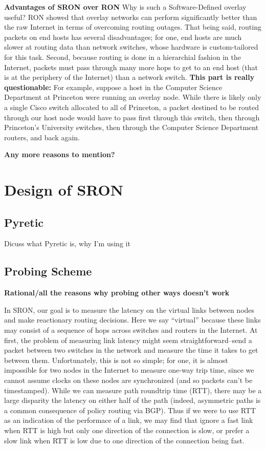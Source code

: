 \documentclass[pageno]{jpaper}
\begin{document}
{\bf Advantages of SRON over RON}
Why is such a Software-Defined overlay useful? RON\cite{ron} showed that overlay networks can 
perform significantly better than the raw Internet in terms of overcoming routing outages. That 
being said, routing packets on end hosts has several disadvantages; for one, end hosts are 
much slower at routing data than network switches, whose hardware is custom-tailored for this task.
Second, because routing is done in a hierarchial fashion in the Internet, packets must pass 
through many more hops to get to an end host (that is at the periphery of the Internet) than a 
network switch.
{\bf This part is really questionable:} 
For example, suppose a host in the Computer Science Department at Princeton 
were running an overlay node. While there is likely only a single Cisco switch allocated to all of 
Princeton, a packet destined to be routed through our host node would have to pass first through this 
switch, then through Princeton's University switches, then through the Computer Science Department
routers, and back again.

{\bf Any more reasons to mention?} 

\section{Design of SRON}

\subsection{Pyretic}
Dicuss what Pyretic is, why I'm using it

\subsection{Probing Scheme}

{\bf Rational/all the reasons why probing other ways doesn't work}\bigskip

In SRON, our goal is to measure the latency on the virtual links between nodes and make reactionary
routing decisions. Here we say ``virtual'' because these links may consist of a sequence of hops
across switches and routers in the Internet. At first, the problem of measuring link latency 
might seem straightforward--send a packet between two switches in the network and measure the time
it takes to get between them. Unfortunately, this is not so simple; for one, it is almost impossible
for two nodes in the Internet to measure one-way trip time, since we cannot assume clocks on these
nodes are synchronized (and so packets can't be timestamped). While we can measure path roundtrip 
time (RTT), there may be a large disparity the latency on either half of the path (indeed, asymmetric
paths is a common consequence of policy routing via BGP). Thus if we were to use RTT as an indication 
of the performace of a link, we may find that ignore a fast link when RTT is high but only one direction
of the connection is slow, or prefer a slow link when RTT is low due to one direction of the connection
being fast. 
\end{document}
